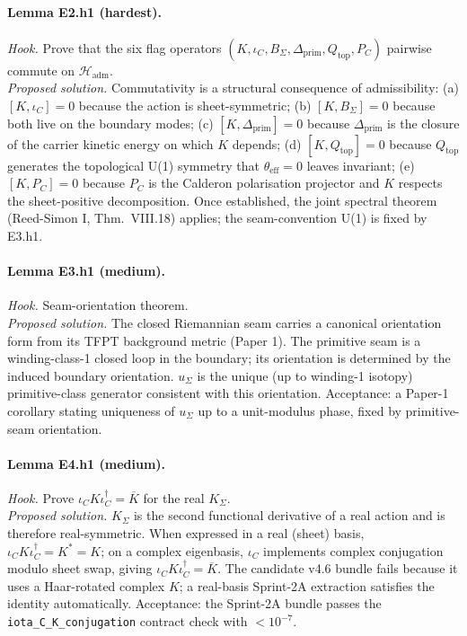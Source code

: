 \paragraph{Lemma E2.h1 (hardest).}
\emph{Hook.}  Prove that the six flag operators
\((K,\iota_C,B_\Sigma,\Delta_{\mathrm{prim}},Q_{\mathrm{top}},P_C)\)
pairwise commute on \(\mathcal H_{\mathrm{adm}}\).\\
\emph{Proposed solution.}  Commutativity is a structural consequence
of admissibility:
(a) \([K,\iota_C]=0\) because the action is sheet-symmetric;
(b) \([K,B_\Sigma]=0\) because both live on the boundary modes;
(c) \([K,\Delta_{\mathrm{prim}}]=0\) because \(\Delta_{\mathrm{prim}}\)
is the closure of the carrier kinetic energy on which \(K\) depends;
(d) \([K,Q_{\mathrm{top}}]=0\) because \(Q_{\mathrm{top}}\) generates
the topological U(1) symmetry that \(\theta_{\mathrm{eff}}=0\) leaves
invariant;
(e) \([K,P_C]=0\) because \(P_C\) is the Calderon polarisation
projector and \(K\) respects the sheet-positive decomposition.  Once
established, the joint spectral theorem (Reed-Simon I, Thm.\ VIII.18)
applies; the seam-convention U(1) is fixed by E3.h1.

\paragraph{Lemma E3.h1 (medium).}
\emph{Hook.}  Seam-orientation theorem.\\
\emph{Proposed solution.}  The closed Riemannian seam carries a
canonical orientation form from its TFPT background metric (Paper 1).
The primitive seam is a winding-class-1 closed loop in the boundary;
its orientation is determined by the induced boundary orientation.
\(u_\Sigma\) is the unique (up to winding-1 isotopy) primitive-class
generator consistent with this orientation.  Acceptance: a Paper-1
corollary stating uniqueness of \(u_\Sigma\) up to a unit-modulus
phase, fixed by primitive-seam orientation.

\paragraph{Lemma E4.h1 (medium).}
\emph{Hook.}  Prove
\(\iota_C K\iota_C^\dagger=\overline{K}\) for the real
\(K_\Sigma\).\\
\emph{Proposed solution.}  \(K_\Sigma\) is the second functional
derivative of a real action and is therefore real-symmetric.  When
expressed in a real (sheet) basis,
\(\iota_C K\iota_C^\dagger=K^* = K\); on a complex eigenbasis,
\(\iota_C\) implements complex conjugation modulo sheet swap, giving
\(\iota_C K\iota_C^\dagger=\overline K\).  The candidate v4.6 bundle
fails because it uses a Haar-rotated complex \(K\); a real-basis
Sprint-2A extraction satisfies the identity automatically.
Acceptance: the Sprint-2A bundle passes the \texttt{iota\_C\_K\_conjugation}
contract check with \(<10^{-7}\).

